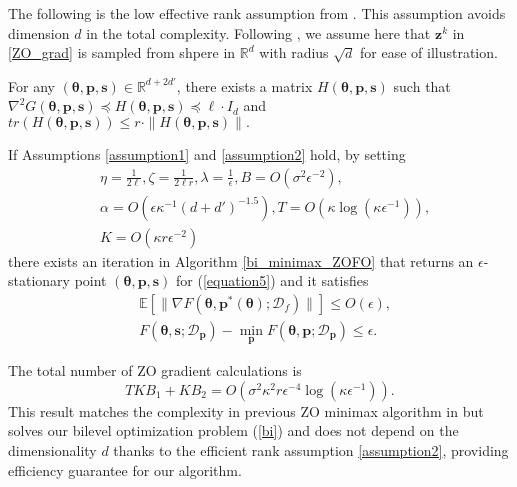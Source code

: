 The following is the low effective rank assumption from \cite{MalladiGNDL0A23Mezo}. This assumption avoids dimension $d$ in the total complexity. Following \cite{MalladiGNDL0A23Mezo}, we assume here that ${ \mathbf{z}}^k$ in \eqref{ZO_grad} is sampled from shpere in $\mathbb{R}^{d}$ with radius $\sqrt{d}$ for ease of illustration.

\begin{assumption}
\label{assumption2}
    For any $({ \mathbf{{ \bm{\theta}}}},{ \mathbf{p}},{ \mathbf{s}})\in\mathbb{R}^{d+2d'}$, there exists a matrix $H({ \mathbf{{ \bm{\theta}}}},{ \mathbf{p}},{ \mathbf{s}})$ such that $\nabla^2 G({ \mathbf{{ \bm{\theta}}}},{ \mathbf{p}},{ \mathbf{s}})\preceq H({ \mathbf{{ \bm{\theta}}}},{ \mathbf{p}},{ \mathbf{s}})\preceq \ell\cdot I_d$ and $tr(H({ \mathbf{{ \bm{\theta}}}},{ \mathbf{p}},{ \mathbf{s}}))\leq r \cdot \|H({ \mathbf{{ \bm{\theta}}}},{ \mathbf{p}},{ \mathbf{s}})\|.$
\end{assumption}

\begin{theorem}
\label{theorem1}
    If Assumptions \ref{assumption1} and \ref{assumption2} hold, by setting 
    \begin{equation*}
    \begin{split}
    &\eta=\frac{1}{2\ell}, \zeta=\frac{1}{2\ell r}, \lambda=\frac{1}{\epsilon}, B=O(\sigma^2\epsilon^{-2}),\\
        &\alpha=O(\epsilon \kappa^{-1}(d+d')^{-1.5}),T=O\left(\kappa\log(\kappa\epsilon^{-1})\right),\\
        &K=O(\kappa r \epsilon^{-2})
    \end{split}
    \end{equation*}
    there exists an iteration in Algorithm \ref{bi_minimax_ZOFO} that returns an $\epsilon$-stationary point $({ \mathbf{{ \bm{\theta}}}},{ \mathbf{p}},{ \mathbf{s}})$ for (\ref{equation5}) and it satisfies
    \begin{equation*}
        \begin{split}
            &\mathbb{E}[\|\nabla F({ \mathbf{{ \bm{\theta}}}},{ \mathbf{p}}^*({ \mathbf{{ \bm{\theta}}}});\mathcal{D}_f)\|]\leq O(\epsilon), \\
            &F({ \mathbf{{ \bm{\theta}}}},{ \mathbf{s}};\mathcal{D}_{ \mathbf{p}})-\min_{ \mathbf{p}} F({ \mathbf{{ \bm{\theta}}}},{ \mathbf{p}};\mathcal{D}_{ \mathbf{p}})\leq \epsilon.
        \end{split}
    \end{equation*}
\end{theorem}

\begin{remark}
    The total number of ZO gradient calculations is $$TKB_1+KB_2=O(\sigma^2\kappa^2 r\epsilon^{-4}\log(\kappa\epsilon^{-1})).$$
    This result matches the complexity in previous ZO minimax algorithm in \cite{wang2023zeroth} but solves our bilevel optimization problem (\ref{bi}) and does not depend on the dimensionality $d$ thanks to the efficient rank assumption \ref{assumption2}, providing efficiency guarantee for our algorithm.
\end{remark}